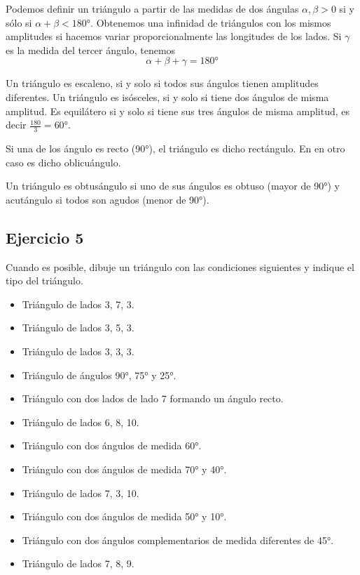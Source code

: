 Podemos definir un triángulo a partir de las medidas de dos ángulas
$\alpha, \beta > 0$ si y sólo si $\alpha + \beta < 180°$. Obtenemos una
infinidad de triángulos con los mismos amplitudes si hacemos variar
proporcionalmente las longitudes de los lados. Si $\gamma$ es la
medida del tercer ángulo, tenemos
$$
\alpha + \beta + \gamma = 180°
$$

Un triángulo es escaleno, si y solo si todos sus ángulos tienen amplitudes
diferentes.
Un triángulo es isósceles, si y solo si tiene dos ángulos de misma amplitud.
Es equilátero si y solo si tiene sus tres ángulos de misma amplitud, es decir
$\frac{180}{3} = 60°$.

Si una de los ángulo es recto (90°), el triángulo es dicho rectángulo. En
en otro caso es dicho oblicuángulo.

\begin{center}
\end{center}

Un triángulo es obtusángulo si uno de sus ángulos es obtuso (mayor de 90°) y
acutángulo si todos son agudos (menor de 90°).

\subsection*{Ejercicio 5}

Cuando es posible, dibuje un triángulo con las condiciones siguientes y indique
el tipo del triángulo.

\begin{itemize}
\item Triángulo de lados 3, 7, 3.
\item Triángulo de lados 3, 5, 3.
\item Triángulo de lados 3, 3, 3.
\item Triángulo de ángulos 90°, 75° y 25°.
\item Triángulo con dos lados de lado 7 formando un ángulo recto.
\item Triángulo de lados 6, 8, 10.
\item Triángulo con dos ángulos de medida 60°.
\item Triángulo con dos ángulos de medida 70° y 40°.
\item Triángulo de lados 7, 3, 10.
\item Triángulo con dos ángulos de medida 50° y 10°.
\item Triángulo con dos ángulos complementarios de medida diferentes de 45°.
\item Triángulo de lados 7, 8, 9.
\end{itemize}

